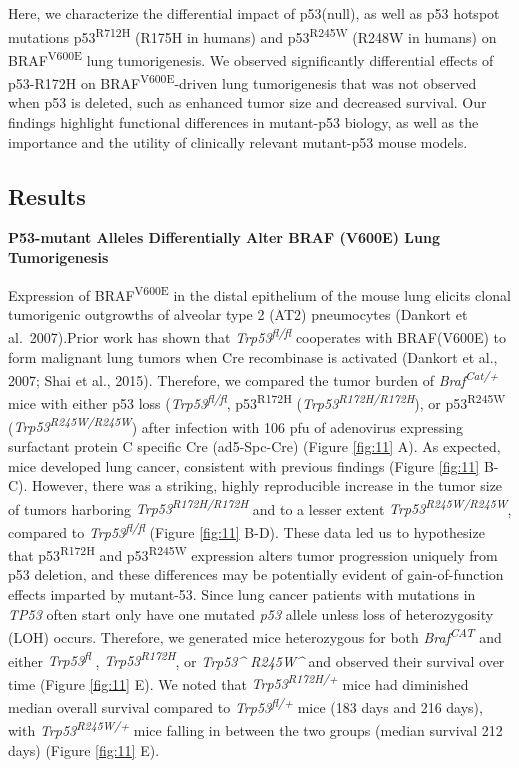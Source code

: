 Here, we characterize the differential impact of p53(null), as well as p53 hotspot mutations p53\textsuperscript{R712H} (R175H in humans) and p53\textsuperscript{R245W} (R248W in humans) on BRAF\textsuperscript{V600E} lung tumorigenesis. We observed significantly differential effects of p53-R172H on BRAF\textsuperscript{V600E}-driven lung tumorigenesis that was not observed when p53 is deleted, such as enhanced tumor size and decreased survival. Our findings highlight functional differences in mutant-p53 biology, as well as the importance and the utility of clinically relevant mutant-p53 mouse models.

\hypertarget{results-1}{%
\subsection{Results}\label{results-1}}

\textbf{P53-mutant Alleles Differentially Alter BRAF (V600E) Lung Tumorigenesis}

Expression of BRAF\textsuperscript{V600E} in the distal epithelium of the mouse lung elicits clonal tumorigenic outgrowths of alveolar type 2 (AT2) pneumocytes (Dankort et al.~2007).Prior work has shown that \emph{Trp53\textsuperscript{fl/fl}} cooperates with BRAF(V600E) to form malignant lung tumors when Cre recombinase is activated (Dankort et al., 2007; Shai et al., 2015). Therefore, we compared the tumor burden of \emph{Braf\textsuperscript{Cat/+}} mice with either p53 loss (\emph{Trp53\textsuperscript{fl/fl}}, p53\textsuperscript{R172H} (\emph{Trp53\textsuperscript{R172H/R172H}}), or p53\textsuperscript{R245W} (\emph{Trp53\textsuperscript{R245W/R245W}}) after infection with 106 pfu of adenovirus expressing surfactant protein C specific Cre (ad5-Spc-Cre) (Figure \ref{fig:11} A). As expected, mice developed lung cancer, consistent with previous findings (Figure \ref{fig:11} B-C). However, there was a striking, highly reproducible increase in the tumor size of tumors harboring \emph{Trp53\textsuperscript{R172H/R172H}} and to a lesser extent \emph{Trp53\textsuperscript{R245W/R245W}}, compared to \emph{Trp53\textsuperscript{fl/fl}} (Figure \ref{fig:11} B-D). These data led us to hypothesize that p53\textsuperscript{R172H} and p53\textsuperscript{R245W} expression alters tumor progression uniquely from p53 deletion, and these differences may be potentially evident of gain-of-function effects imparted by mutant-53. Since lung cancer patients with mutations in \emph{TP53} often start only have one mutated \emph{p53} allele unless loss of heterozygosity (LOH) occurs. Therefore, we generated mice heterozygous for both \emph{Braf\textsuperscript{CAT}} and either \emph{Trp53\textsuperscript{fl}} , \emph{Trp53\textsuperscript{R172H}}, or \emph{Trp53\^{} R245W\^{}} and observed their survival over time (Figure \ref{fig:11} E). We noted that \emph{Trp53\textsuperscript{R172H/+}} mice had diminished median overall survival compared to \emph{Trp53\textsuperscript{fl/+}} mice (183 days and 216 days), with \emph{Trp53\textsuperscript{R245W/+}} mice falling in between the two groups (median survival 212 days) (Figure \ref{fig:11} E).

